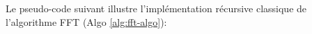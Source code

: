 



Le pseudo-code suivant illustre l’implémentation récursive classique de l’algorithme FFT (Algo \ref{alg:fft-algo}):\\



    



